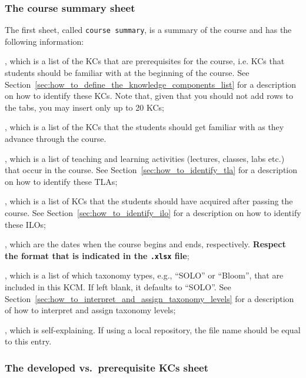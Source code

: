 \subsubsection{The course summary sheet}
\label{sssec:the_course_summary_sheet}

The first sheet, called \texttt{course summary}, is a summary of the course and has the following information:

\begin{itemize}

	, which is a list of the \acp{KC} that are prerequisites for the course, i.e. \acp{KC} that students should be familiar with at the beginning of the course. See Section~\ref{sec:how_to_define_the_knowledge_components_list} for a description on how to identify these \acp{KC}. Note that, given that you should not add rows to the tabs, you may insert only up to 20 \acp{KC};
	
	, which is a list of the \acp{KC} that the students should get familiar with as they advance through the course.
	
	, which is a list of teaching and learning activities (lectures, classes, labs etc.) that occur in the course. See Section~\ref{sec:how_to_identify_tla} for a description on how to identify these \acp{TLA};
	
	, which is a list of \acp{KC} that the students should have acquired after passing the course. See Section~\ref{sec:how_to_identify_ilo} for a description on how to identify these \acp{ILO};
	
	, which are the dates when the course begins and ends, respectively. \textbf{Respect the format that is indicated in the \texttt{.xlsx} file};
	
	, which is a list of which taxonomy types, e.g., ``SOLO'' or ``Bloom'', that are included in this \ac{KCM}. If left blank, it defaults to ``SOLO''. See Section~\ref{sec:how_to_interpret_and_assign_taxonomy_levels} for a description of how to interpret and assign taxonomy levels;
	
	, which is self-explaining. If using a local repository, the file name should be equal to this entry.

\end{itemize}


\subsubsection{The developed vs.\ prerequisite KCs sheet}

